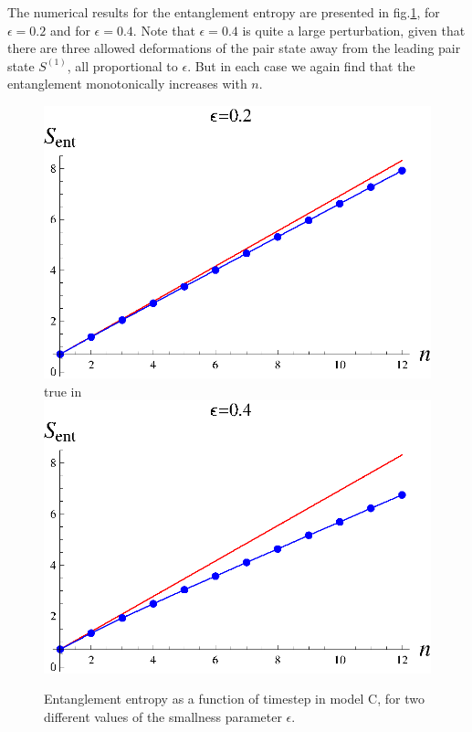\documentclass[11pt]{article}
\begin{document}
The numerical results for the entanglement entropy are presented in fig.\ref{fn6m}, for $\epsilon=0.2$ and for $\epsilon=0.4$. Note that $\epsilon=0.4$ is quite a large perturbation, given that there are three allowed deformations of the pair state away from the leading pair state $S^{(1)}$, all proportional to $\epsilon$. But in each case we again find that the entanglement monotonically increases with $n$.

\begin{figure}[htbp]
\begin{center}
\includegraphics[scale=.58]{modelc2.eps} true in
\includegraphics[scale=.58]{modelc4.eps}
\caption{{Entanglement entropy as a function of timestep in model C, for  two different values of the smallness parameter $\epsilon$.}}
\label{fn6m}
\end{center}
\end{figure}
\end{document}
